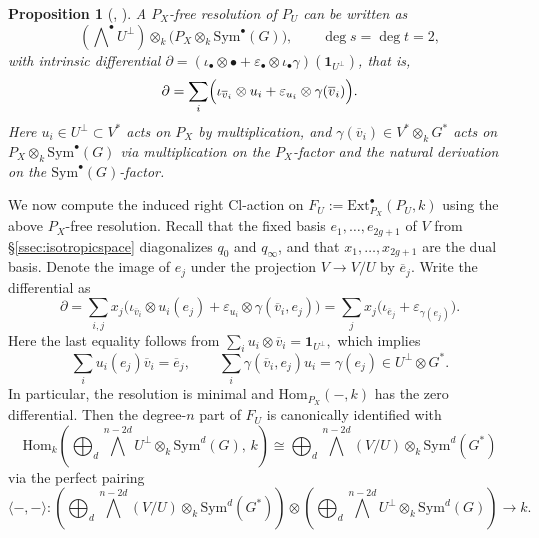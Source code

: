 \documentclass[12pt, letterpaper]{amsart}
\newtheorem{proposition}[theorem]{Proposition}
\theoremstyle{definition}
\newcommand{\ga}{\gamma}
\def\rHom{\mathrm{Hom} }
\def\Ext{\mathrm{Ext} }
\def\Sym{\mathrm{Sym} }
\def\Cl{\mathrm{Cl}}
\begin{document}
\begin{proposition}[{\cite[Theorem~4]{Tat57}, \cite[\S2]{Eis80}}]\label{prop:KT_resolution}
A \(P_X\)-free resolution of \(P_U\) can be written as
\[\left(\bigwedge\nolimits^\bullet U^\perp\right)\otimes_k\bigl(P_X\otimes_k \Sym^\bullet(G)\bigr),\qquad\deg s=\deg t=2,\]
with intrinsic differential \(\partial=(\iota_\bullet\otimes\bullet+\varepsilon_\bullet\otimes\iota_\bullet\ga)(\mathbf 1_{U^\perp})\), that is,
\[\partial=\sum_i\Bigl(\iota_{\overline v_i}\otimes u_i+\varepsilon_{u_i}\otimes\ga(\overline v_i)\Bigr).\]
Here \(u_i\in U^\perp\subset V^*\) acts on \(P_X\) by multiplication, and \(\ga(\overline v_i)\in V^*\otimes_k G^*\) acts on \(P_X\otimes_k\Sym^\bullet(G)\) via multiplication on the \(P_X\)-factor and the natural derivation on the \(\Sym^\bullet(G)\)-factor.
\end{proposition}

We now compute the induced right \(\Cl\)-action on \(F_U:=\Ext^\bullet_{P_X}(P_U,k)\) using the above \(P_X\)-free resolution. Recall that the fixed basis \(e_1,\dots,e_{2g+1}\) of \(V\) from \S\ref{ssec:isotropicspace} diagonalizes \(q_0\) and \(q_\infty\), and that \(x_1,\dots,x_{2g+1}\) are the dual basis. Denote the image of \(e_j\) under the projection \(V \to V/U\) by \(\overline e_j\). Write the differential as
\begin{equation}\label{eq:diff_coeff}
\partial=\sum_{i,j}x_j\bigl(\iota_{\overline v_i}\otimes u_i(e_j)+\varepsilon_{u_i}\otimes\ga(\overline v_i,e_j)\bigr) =\sum_j x_j\bigl(\iota_{\overline e_j}+\varepsilon_{\ga(e_j)}\bigr).
\end{equation}
Here the last equality follows from \(\sum_i u_i\otimes \overline v_i=\mathbf 1_{U^\perp},\) which implies
\[\sum_i u_i(e_j)\overline v_i=\overline e_j,\qquad\sum_i\ga(\overline v_i,e_j)u_i=\ga(e_j)\in U^\perp\otimes G^*.\]
In particular, the resolution is minimal and \(\rHom_{P_X}(-,k)\) has the zero differential. Then the degree-\(n\) part of \(F_U\) is canonically identified with
\[\rHom_k\!\left( \bigoplus_d \bigwedge^{n-2d}U^\perp\otimes_k \Sym^d(G),\,k \right) \cong \bigoplus_d \bigwedge^{n-2d}(V/U)\otimes_k \Sym^d(G^*)\]
via the perfect pairing
\begin{equation}\label{eq:perf_pair}
\langle-,-\rangle: \left( \bigoplus_d \bigwedge^{n-2d}(V/U)\otimes_k \Sym^d(G^*) \right) \otimes \left( \bigoplus_d \bigwedge^{n-2d}U^\perp\otimes_k \Sym^d(G) \right) \longrightarrow k.
\end{equation}
\end{document}

